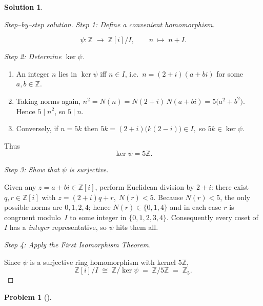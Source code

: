 \documentclass[12pt]{article}
\theoremstyle{definition} %
\newtheorem{solution}{Solution}
\newtheorem{problem}{Problem}
\theoremstyle{plain} %
\begin{document}
\begin{solution}
\begin{proof}[Step--by--step solution]
    \smallskip
    \textit{Step 1:  Define a convenient homomorphism.}
    
    \[
      \psi:\mathbb{Z}\;\longrightarrow\;\mathbb{Z}[i]/I,
      \qquad
      n\;\longmapsto\;n+I.
    \]
    
    \smallskip
    \textit{Step 2:  Determine \(\ker\psi\).}
    
    \begin{enumerate}[label=\alph*.]
      \item An integer $n$ lies in $\ker\psi$ iff $n\in I$, i.e.\ $n=(2+i)(a+bi)$
            for some $a,b\in\mathbb{Z}$.
      \item Taking norms again,
            \(
              n^{2}=N(n)=N(2+i)\,N(a+bi)
                     =5\bigl(a^{2}+b^{2}\bigr).
            \)
            Hence $5\mid n^{2}$, so $5\mid n$.
      \item Conversely, if $n=5k$ then
            \(
              5k=(2+i)\bigl(k(2-i)\bigr)\in I,
            \)
            so $5k\in\ker\psi$.
    \end{enumerate}
    Thus
    \[
      \ker\psi = 5\mathbb{Z}.
    \]
    
    \smallskip
    \textit{Step 3:  Show that \(\psi\) is surjective.}
    
    Given any $z=a+bi\in\mathbb{Z}[i]$, perform Euclidean division by $2+i$:
    there exist $q,r\in\mathbb{Z}[i]$ with
    \(
      z=(2+i)q+r,\;N(r)<5.
    \)
    Because $N(r)<5$, the only possible norms are $0,1,2,4$; hence
    $N(r)\in\{0,1,4\}$ and in each case $r$ is congruent modulo~$I$
    to some integer in $\{0,1,2,3,4\}$.  Consequently every coset of $I$ has a
    \emph{integer} representative, so $\psi$ hits them all.
    
    \smallskip
    \textit{Step 4:  Apply the First Isomorphism Theorem.}
    
    Since $\psi$ is a surjective ring homomorphism with kernel $5\mathbb{Z}$,
    \[
      \mathbb{Z}[i]/I
      \;\cong\;
      \mathbb{Z}\big/\ker\psi
      \;=\;
      \mathbb{Z}\big/5\mathbb{Z}
      \;=\;
      \boxed{\mathbb{Z}_5}.
    \]
    \end{proof}
\end{solution}
\begin{problem}[]
  
\end{problem}
\end{document}
